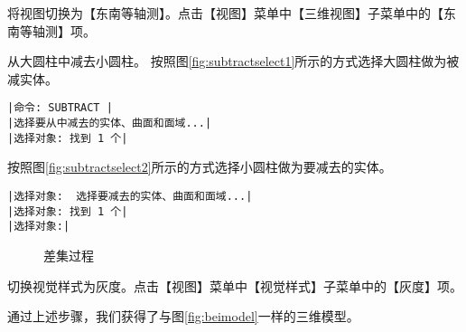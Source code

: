 \begin{procedure}
\item 将视图切换为【东南等轴测】。点击【视图】菜单中【三维视图】子菜单中的【东南等轴测】项。
\item 从大圆柱中减去小圆柱。
按照图\ref{fig:subtractselect1}所示的方式选择大圆柱做为被减实体。
\begin{lstlisting}
|命令: SUBTRACT |
|选择要从中减去的实体、曲面和面域...|
|选择对象: 找到 1 个|
\end{lstlisting}
按照图\ref{fig:subtractselect2}所示的方式选择小圆柱做为要减去的实体。
\begin{lstlisting}
|选择对象:  选择要减去的实体、曲面和面域...|
|选择对象: 找到 1 个|
|选择对象:|
\end{lstlisting}
\begin{figure}[htbp]
\centering
{}\hspace{20pt}
\caption{差集过程}
\end{figure}
\item 切换视觉样式为灰度。点击【视图】菜单中【视觉样式】子菜单中的【灰度】项。
\end{procedure}

通过上述步骤，我们获得了与图\ref{fig:beimodel}一样的三维模型。


\endinput